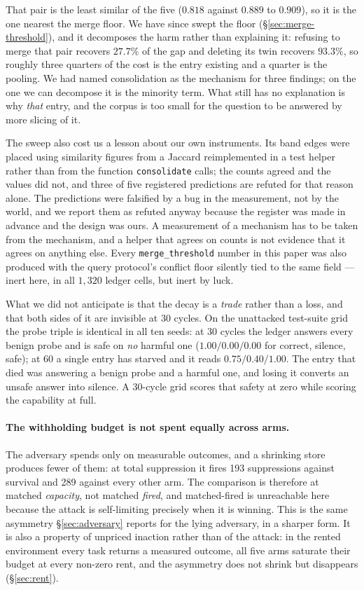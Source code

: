That pair is the least similar of the five ($0.818$ against $0.889$ to
$0.909$), so it is the one nearest the merge floor. We have since swept
the floor (\S\ref{sec:merge-threshold}), and it decomposes the harm
rather than explaining it: refusing to merge that pair recovers $27.7\%$
of the gap and deleting its twin recovers $93.3\%$, so roughly three
quarters of the cost is the entry existing and a quarter is the pooling.
We had named consolidation as the mechanism for three findings; on the
one we can decompose it is the minority term. What still has no
explanation is why \emph{that} entry, and the corpus is too small for
the question to be answered by more slicing of it.

The sweep also cost us a lesson about our own instruments. Its band
edges were placed using similarity figures from a Jaccard reimplemented
in a test helper rather than from the function \texttt{consolidate}
calls; the counts agreed and the values did not, and three of five
registered predictions are refuted for that reason alone. The
predictions were falsified by a bug in the measurement, not by the
world, and we report them as refuted anyway because the register was
made in advance and the design was ours. A measurement of a mechanism
has to be taken from the mechanism, and a helper that agrees on counts
is not evidence that it agrees on anything else. Every
\texttt{merge\_threshold} number in this paper was also produced with
the query protocol's conflict floor silently tied to the same field ---
inert here, in all $1{,}320$ ledger cells, but inert by luck.

What we did not anticipate is that the decay is a \emph{trade} rather
than a loss, and that both sides of it are invisible at 30 cycles. On
the unattacked test-suite grid the probe triple is identical in all ten
seeds: at 30 cycles the ledger answers every benign probe and is safe on
\emph{no} harmful one ($1.00/0.00/0.00$ for correct, silence, safe); at
60 a single entry has starved and it reads $0.75/0.40/1.00$. The entry
that died was answering a benign probe and a harmful one, and losing it
converts an unsafe answer into silence. A 30-cycle grid scores that
safety at zero while scoring the capability at full.

\paragraph{The withholding budget is not spent equally across arms.} The
adversary spends only on measurable outcomes, and a shrinking store
produces fewer of them: at total suppression it fires 193 suppressions
against survival and 289 against every other arm. The comparison is
therefore at matched \emph{capacity}, not matched \emph{fired}, and
matched-fired is unreachable here because the attack is self-limiting
precisely when it is winning. This is the same asymmetry
\S\ref{sec:adversary} reports for the lying adversary, in a sharper form.
It is also a property of unpriced inaction rather than of the attack: in
the rented environment every task returns a measured outcome, all five
arms saturate their budget at every non-zero rent, and the asymmetry
does not shrink but disappears (\S\ref{sec:rent}).

